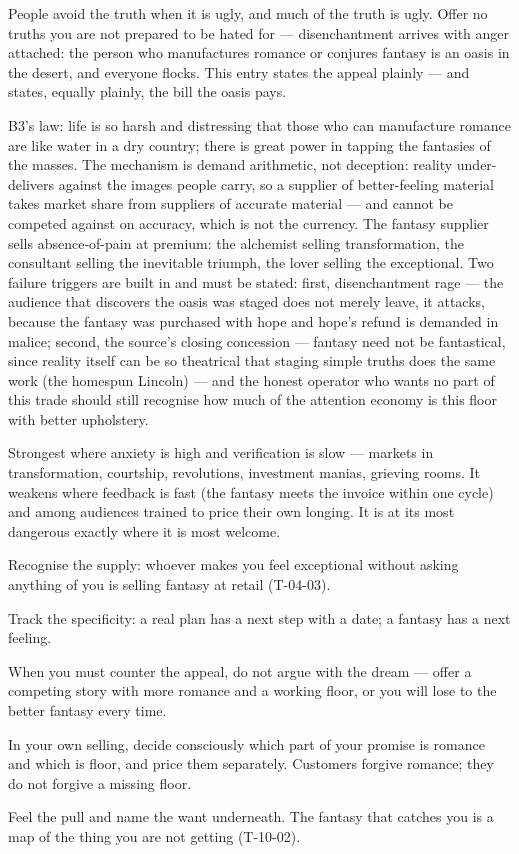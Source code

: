 \begin{core}
People avoid the truth when it is ugly, and much of the truth is ugly. Offer no truths you are not prepared to be hated for --- disenchantment arrives with anger attached: the person who manufactures romance or conjures fantasy is an oasis in the desert, and everyone flocks. This entry states the appeal plainly --- and states, equally plainly, the bill the oasis pays.
\end{core}
\begin{mechanism}
B3's law: life is so harsh and distressing that those who can manufacture romance are like water in a dry country; there is great power in tapping the fantasies of the masses. The mechanism is demand arithmetic, not deception: reality under-delivers against the images people carry, so a supplier of better-feeling material takes market share from suppliers of accurate material --- and cannot be competed against on accuracy, which is not the currency. The fantasy supplier sells absence-of-pain at premium: the alchemist selling transformation, the consultant selling the inevitable triumph, the lover selling the exceptional. Two failure triggers are built in and must be stated: first, disenchantment rage --- the audience that discovers the oasis was staged does not merely leave, it attacks, because the fantasy was purchased with hope and hope's refund is demanded in malice; second, the source's closing concession --- fantasy need not be fantastical, since reality itself can be so theatrical that staging simple truths does the same work (the homespun Lincoln) --- and the honest operator who wants no part of this trade should still recognise how much of the attention economy is this floor with better upholstery.
\end{mechanism}
\begin{conditions}
Strongest where anxiety is high and verification is slow --- markets in transformation, courtship, revolutions, investment manias, grieving rooms. It weakens where feedback is fast (the fantasy meets the invoice within one cycle) and among audiences trained to price their own longing. It is at its most dangerous exactly where it is most welcome.
\end{conditions}
\begin{application}
  \item Recognise the supply: whoever makes you feel exceptional without asking anything of you is selling fantasy at retail (T-04-03).
  \item Track the specificity: a real plan has a next step with a date; a fantasy has a next feeling.
  \item When you must counter the appeal, do not argue with the dream --- offer a competing story with more romance and a working floor, or you will lose to the better fantasy every time.
  \item In your own selling, decide consciously which part of your promise is romance and which is floor, and price them separately. Customers forgive romance; they do not forgive a missing floor.
  \item Feel the pull and name the want underneath. The fantasy that catches you is a map of the thing you are not getting (T-10-02).
\end{application}

